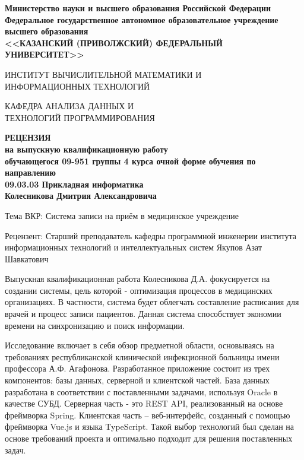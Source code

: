 \documentclass[a4paper,article]{article}
\begin{document}
\begin{sloppypar}
    \begin{center}
        \textbf{Министерство науки и высшего образования Российской Федерации \\
        Федеральное государственное автономное образовательное учреждение \\
        высшего образования\\
        <<КАЗАНСКИЙ (ПРИВОЛЖСКИЙ) ФЕДЕРАЛЬНЫЙ УНИВЕРСИТЕТ>>} \\
    \end{center}
    
    \begin{center}
        ИНСТИТУТ ВЫЧИСЛИТЕЛЬНОЙ МАТЕМАТИКИ И \\
        ИНФОРМАЦИОННЫХ ТЕХНОЛОГИЙ
    \end{center}
    
    \begin{center}
        КАФЕДРА АНАЛИЗА ДАННЫХ И \\
        ТЕХНОЛОГИЙ ПРОГРАММИРОВАНИЯ
    \end{center}

    \begin{center}
        \textbf{РЕЦЕНЗИЯ \\
        на выпускную квалификационную работу \\
        обучающегося 09-951 группы 4 курса очной форме обучения по направлению \\
        09.03.03 Прикладная информатика \\
        Колесникова Дмитрия Александровича} \\
    \end{center}

    Тема ВКР: Система записи на приём в медицинское учреждение
    
    Рецензент: Старший преподаватель кафедры программной инженерии института информационных технологий и интеллектуальных систем Якупов Азат Шавкатович \newline
    
    Выпускная квалификационная работа Колесникова Д.А. фокусируется на создании системы, цель которой - оптимизация процессов в медицинских организациях. В частности, система будет облегчать составление расписания для врачей и процесс записи пациентов. Данная система способствует экономии времени на синхронизацию и поиск информации.
    
    Исследование включает в себя обзор предметной области, основываясь на требованиях республиканской клинической инфекционной больницы имени профессора А.Ф. Агафонова. Разработанное приложение состоит из трех компонентов: базы данных, серверной и клиентской частей. База данных разработана в соответствии с поставленными задачами, используя Oracle в качестве СУБД. Серверная часть - это REST API, реализованный на основе фреймворка Spring. Клиентская часть – веб-интерфейс, созданный с помощью фреймворка Vue.js и языка TypeScript. Такой выбор технологий был сделан на основе требований проекта и оптимально подходит для решения поставленных задач.
    

\end{sloppypar}
\end{document}
